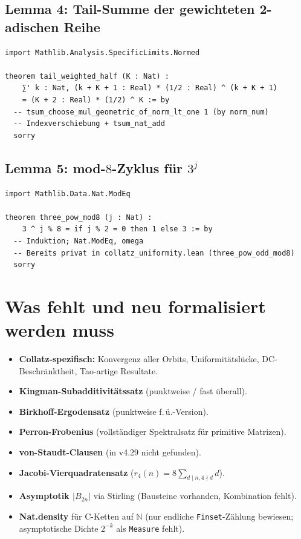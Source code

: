 \documentclass[12pt,a4paper]{article}
\begin{document}
\subsection{Lemma 4: Tail-Summe der gewichteten 2-adischen Reihe}

\begin{lstlisting}[language=Lean4]
import Mathlib.Analysis.SpecificLimits.Normed

theorem tail_weighted_half (K : Nat) :
    ∑' k : Nat, (k + K + 1 : Real) * (1/2 : Real) ^ (k + K + 1)
    = (K + 2 : Real) * (1/2) ^ K := by
  -- tsum_choose_mul_geometric_of_norm_lt_one 1 (by norm_num)
  -- Indexverschiebung + tsum_nat_add
  sorry
\end{lstlisting}

\subsection{Lemma 5: mod-$8$-Zyklus für $3^j$}

\begin{lstlisting}[language=Lean4]
import Mathlib.Data.Nat.ModEq

theorem three_pow_mod8 (j : Nat) :
    3 ^ j % 8 = if j % 2 = 0 then 1 else 3 := by
  -- Induktion; Nat.ModEq, omega
  -- Bereits privat in collatz_uniformity.lean (three_pow_odd_mod8)
  sorry
\end{lstlisting}

\section{Was fehlt und neu formalisiert werden muss}
\label{sec:fehlt}

\begin{tcolorbox}[luecke,title={Definitiv nicht in Mathlib (Stand Juni 2026)}]
\begin{itemize}[nosep]
  \item \textbf{Collatz-spezifisch:} Konvergenz aller Orbits, Uniformitätslücke,
    DC-Beschränktheit, Tao-artige Resultate.
  \item \textbf{Kingman-Subadditivitätssatz} (punktweise / fast überall).
  \item \textbf{Birkhoff-Ergodensatz} (punktweise f.\,ü.-Version).
  \item \textbf{Perron-Frobenius} (vollständiger Spektralsatz für primitive Matrizen).
  \item \textbf{von-Staudt-Clausen} (in v4.29 nicht gefunden).
  \item \textbf{Jacobi-Vierquadratensatz} ($r_4(n)=8\sum_{d\mid n,4\nmid d}d$).
  \item \textbf{Asymptotik $|B_{2n}|$} via Stirling (Bausteine vorhanden, Kombination fehlt).
  \item \textbf{Nat.density} für C-Ketten auf $\mathbb{N}$ (nur endliche \texttt{Finset}-Zählung
    bewiesen; asymptotische Dichte $2^{-k}$ als \texttt{Measure} fehlt).
\end{itemize}
\end{tcolorbox}
\end{document}
